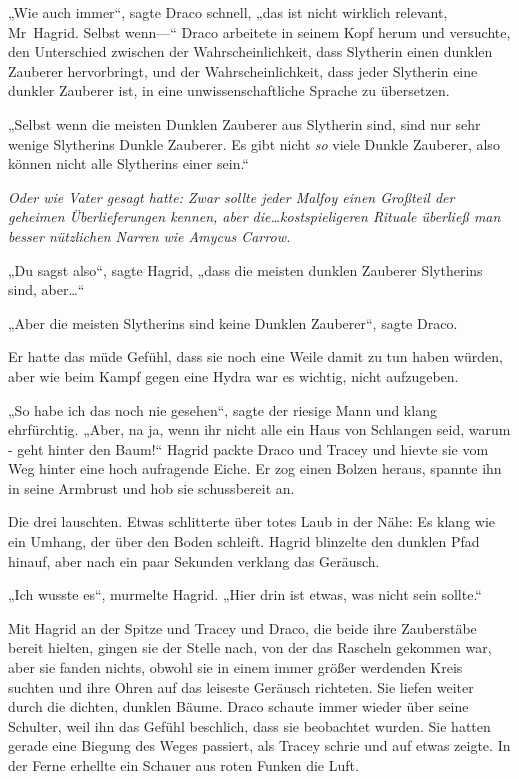 {„Wie auch immer“, sagte Draco schnell, „das ist nicht wirklich relevant, Mr~Hagrid. Selbst wenn—“ Draco arbeitete in seinem Kopf herum und versuchte, den Unterschied zwischen der Wahrscheinlichkeit, dass Slytherin einen dunklen Zauberer hervorbringt, und der Wahrscheinlichkeit, dass jeder Slytherin eine dunkler Zauberer ist, in eine unwissenschaftliche Sprache zu übersetzen.

„Selbst wenn die meisten Dunklen Zauberer aus Slytherin sind, sind nur sehr wenige Slytherins Dunkle Zauberer. Es gibt nicht \emph{so} viele Dunkle Zauberer, also können nicht alle Slytherins einer sein.“

\emph{Oder wie Vater gesagt hatte: Zwar sollte jeder Malfoy einen Großteil der geheimen Überlieferungen kennen, aber die…kostspieligeren Rituale überließ man besser nützlichen Narren wie Amycus Carrow.}

„Du sagst also“, sagte Hagrid, „dass die meisten dunklen Zauberer Slytherins sind, aber…“

„Aber die meisten Slytherins sind keine Dunklen Zauberer“, sagte Draco.

Er hatte das müde Gefühl, dass sie noch eine Weile damit zu tun haben würden, aber wie beim Kampf gegen eine Hydra war es wichtig, nicht aufzugeben.

„So habe ich das noch nie gesehen“, sagte der riesige Mann und klang ehrfürchtig. „Aber, na ja, wenn ihr nicht alle ein Haus von Schlangen seid, warum - geht hinter den Baum!“ Hagrid packte Draco und Tracey und hievte sie vom Weg hinter eine hoch aufragende Eiche. Er zog einen Bolzen heraus, spannte ihn in seine Armbrust und hob sie schussbereit an.

Die drei lauschten. Etwas schlitterte über totes Laub in der Nähe: Es klang wie ein Umhang, der über den Boden schleift. Hagrid blinzelte den dunklen Pfad hinauf, aber nach ein paar Sekunden verklang das Geräusch.

„Ich wusste es“, murmelte Hagrid. „Hier drin ist etwas, was nicht sein sollte.“

Mit Hagrid an der Spitze und Tracey und Draco, die beide ihre Zauberstäbe bereit hielten, gingen sie der Stelle nach, von der das Rascheln gekommen war, aber sie fanden nichts, obwohl sie in einem immer größer werdenden Kreis suchten und ihre Ohren auf das leiseste Geräusch richteten. Sie liefen weiter durch die dichten, dunklen Bäume. Draco schaute immer wieder über seine Schulter, weil ihn das Gefühl beschlich, dass sie beobachtet wurden. Sie hatten gerade eine Biegung des Weges passiert, als Tracey schrie und auf etwas zeigte. In der Ferne erhellte ein Schauer aus roten Funken die Luft.

}
